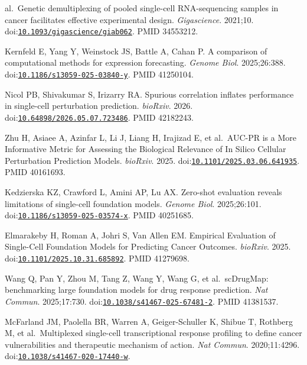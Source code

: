 \documentclass[11pt]{article}
\begin{document}
\begin{enumerate}[label={[\arabic*]},leftmargin=2.6em,labelsep=0.5em,itemsep=1.5pt]
  al.~Genetic demultiplexing of pooled single-cell RNA-sequencing
  samples in cancer facilitates effective experimental design.
  \emph{Gigascience}. 2021;10.
  doi:\href{https://doi.org/10.1093/gigascience/giab062}{\nolinkurl{10.1093/gigascience/giab062}}.
  PMID 34553212.
\item
  Kernfeld E, Yang Y, Weinstock JS, Battle A, Cahan P. A comparison of
  computational methods for expression forecasting. \emph{Genome Biol}.
  2025;26:388.
  doi:\href{https://doi.org/10.1186/s13059-025-03840-y}{\nolinkurl{10.1186/s13059-025-03840-y}}.
  PMID 41250104.
\item
  Nicol PB, Shivakumar S, Irizarry RA. Spurious correlation inflates
  performance in single-cell perturbation prediction. \emph{bioRxiv}.
  2026.
  doi:\href{https://doi.org/10.64898/2026.05.07.723486}{\nolinkurl{10.64898/2026.05.07.723486}}.
  PMID 42182243.
\item
  Zhu H, Asiaee A, Azinfar L, Li J, Liang H, Irajizad E, et al.~AUC-PR
  is a More Informative Metric for Assessing the Biological Relevance of
  In Silico Cellular Perturbation Prediction Models. \emph{bioRxiv}.
  2025.
  doi:\href{https://doi.org/10.1101/2025.03.06.641935}{\nolinkurl{10.1101/2025.03.06.641935}}.
  PMID 40161693.
\item
  Kedzierska KZ, Crawford L, Amini AP, Lu AX. Zero-shot evaluation
  reveals limitations of single-cell foundation models. \emph{Genome
  Biol}. 2025;26:101.
  doi:\href{https://doi.org/10.1186/s13059-025-03574-x}{\nolinkurl{10.1186/s13059-025-03574-x}}.
  PMID 40251685.
\item
  Elmarakeby H, Roman A, Johri S, Van Allen EM. Empirical Evaluation of
  Single-Cell Foundation Models for Predicting Cancer Outcomes.
  \emph{bioRxiv}. 2025.
  doi:\href{https://doi.org/10.1101/2025.10.31.685892}{\nolinkurl{10.1101/2025.10.31.685892}}.
  PMID 41279698.
\item
  Wang Q, Pan Y, Zhou M, Tang Z, Wang Y, Wang G, et al.~scDrugMap:
  benchmarking large foundation models for drug response prediction.
  \emph{Nat Commun}. 2025;17:730.
  doi:\href{https://doi.org/10.1038/s41467-025-67481-2}{\nolinkurl{10.1038/s41467-025-67481-2}}.
  PMID 41381537.
\item
  McFarland JM, Paolella BR, Warren A, Geiger-Schuller K, Shibue T,
  Rothberg M, et al.~Multiplexed single-cell transcriptional response
  profiling to define cancer vulnerabilities and therapeutic mechanism
  of action. \emph{Nat Commun}. 2020;11:4296.
  doi:\href{https://doi.org/10.1038/s41467-020-17440-w}{\nolinkurl{10.1038/s41467-020-17440-w}}.

\end{enumerate}
\end{document}
